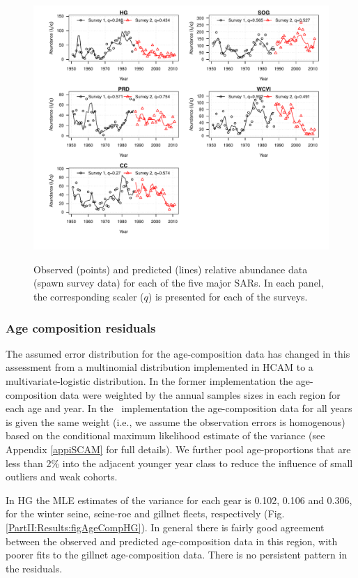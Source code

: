 \begin{figure}[!tbp]
	\includegraphics[width=\textwidth]{../FIGS/qPriorFigs/iscam_fig_surveyfit.pdf}\\
	\caption{Observed (points) and predicted (lines) relative abundance data (spawn survey data) for each of the five major SARs.  In each panel, the corresponding scaler ($q$) is presented for each of the surveys.}\label{PartII:Results:fig3}
\end{figure}


\subsubsection{Age composition residuals}

The assumed error distribution for the age-composition data has changed in this assessment from a multinomial distribution implemented in HCAM to a multivariate-logistic distribution. In the former implementation the age-composition data were weighted by the annual samples sizes in each region for each age and year. In the \iscam\ implementation the age-composition data for all years is given the same weight (i.e., we assume the observation errors is homogenous) based on the conditional maximum likelihood estimate of the variance (see Appendix \ref{appiSCAM} for full details).  We further pool age-proportions that are less than 2\% into the adjacent younger year class to reduce the influence of small outliers and weak cohorts.

In HG the MLE estimates of the variance for each gear is 0.102, 0.106 and 0.306, for the winter seine, seine-roe and gillnet fleets, respectively (Fig. \ref{PartII:Results:figAgeCompHG}).  In general there is fairly good agreement between the observed and predicted age-composition data in this region, with poorer fits to the gillnet age-composition data.  There is no persistent pattern in the residuals. 

